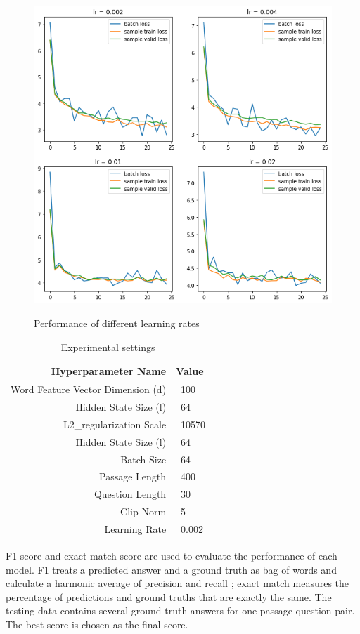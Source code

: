 \documentclass[modernstyle,12pt]{sjsuthesis}
\theoremstyle{definition}
\begin{document}
\begin{figure}[htbp]\centering
  \includegraphics[width=12cm, height=12cm]{figures/lr.png}
  \caption{Performance of different learning rates}
  \label{f:lr}
\end{figure}

\begin{table}[htbp]\centering
  \caption{Experimental settings}
  \label{tab:settings}
  \begin{tabular}{|r|l|} \hline
    Hyperparameter Name& Value \\ \hline\hline
    Word Feature Vector Dimension (d) & \ 100 \\
    Hidden State Size (l) & \ 64 \\
    L2\_regularization Scale & \ 10570\\
    Hidden State Size (l) & \ 64\\
    Batch Size & \ 64\\
    Passage Length & \ 400\\
    Question Length & \ 30\\
    Clip Norm & \ 5\\
    Learning Rate & \ 0.002 \\ \hline
  \end{tabular}
\end{table}

F1 score and exact match score are used to evaluate the performance of each model. F1 treats a predicted answer and a ground truth as bag of words and calculate a harmonic average of precision and recall ; exact match measures the percentage of predictions and ground truths that are exactly the same. The testing data contains several ground truth answers for one passage-question pair. The best score is chosen as the final score.
\end{document}
